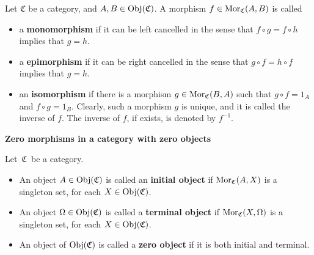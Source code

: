 
\vskip 0.5cm
\begin{definition}
\mbox{}
\vskip 0.1cm
\noindent
Let $\mathfrak{C}$ be a category, and $A, B \in \textnormal{Obj}(\mathfrak{C})$.
A morphism $f \in \textnormal{Mor}_{\mathfrak{C}}(A,B)$ is called
\begin{itemize}
\item
	a \textbf{monomorphism} if it can be {\color{red}left} cancelled in the sense that
	$f \circ g = f \circ h$  implies that $g = h$.
\item
	a \textbf{epimorphism} if it can be {\color{red}right} cancelled in the sense that
	$g \circ f = h \circ f$  implies that $g = h$.
\item
	an \textbf{isomorphism} if there is a morphism $g \in \textnormal{Mor}_{\mathfrak{C}}(B,A)$
	such that $g \circ f = 1_{A}$ and $f \circ g = 1_{B}$.
	Clearly, such a morphism $g$ is unique, and it is called the inverse of $f$.
	The inverse of $f$, if exists, is denoted by $f^{-1}$.
\end{itemize}
\end{definition}


\vskip 1.0cm
\noindent
\textbf{\large Zero morphisms in a category with zero objects}


\vskip 0.5cm
\begin{definition}
\mbox{}
\vskip 0.15cm
\noindent
Let \,$\mathfrak{C}$\, be a category.
\begin{itemize}
\item
	An object $A \in \textnormal{Obj}(\mathfrak{C})$ is called an \textbf{initial object} if $\textnormal{Mor}_{\mathfrak{C}}(A,X)$ is a singleton set,
	for each $X \in \textnormal{Obj}(\mathfrak{C})$.
\item
	An object $\Omega \in \textnormal{Obj}(\mathfrak{C})$ is called a \textbf{terminal object} if $\textnormal{Mor}_{\mathfrak{C}}(X,\Omega)$ is a singleton set,
	for each $X \in \textnormal{Obj}(\mathfrak{C})$.
\item
	An object of $\textnormal{Obj}(\mathfrak{C})$ is called a \textbf{zero object} if it is both initial and terminal.
\end{itemize}
\end{definition}


